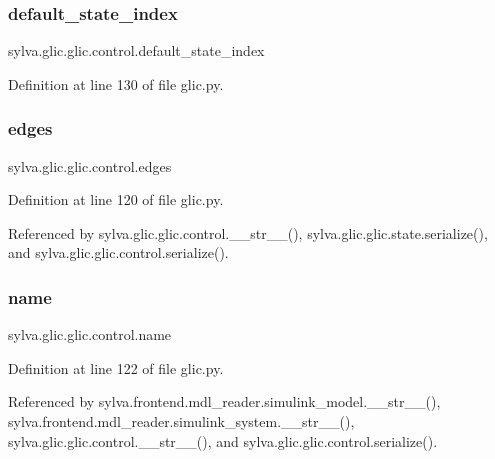 \subsubsection{\texorpdfstring{default\+\_\+state\+\_\+index}{default\_state\_index}}
{\footnotesize\ttfamily sylva.\+glic.\+glic.\+control.\+default\+\_\+state\+\_\+index}



Definition at line 130 of file glic.\+py.

\mbox{\label{classsylva_1_1glic_1_1glic_1_1control_ae0839083f2b17473598890c7b4690e4f}} 
\subsubsection{\texorpdfstring{edges}{edges}}
{\footnotesize\ttfamily sylva.\+glic.\+glic.\+control.\+edges}



Definition at line 120 of file glic.\+py.



Referenced by sylva.\+glic.\+glic.\+control.\+\_\+\+\_\+str\+\_\+\+\_\+(), sylva.\+glic.\+glic.\+state.\+serialize(), and sylva.\+glic.\+glic.\+control.\+serialize().

\mbox{\label{classsylva_1_1glic_1_1glic_1_1control_a95f657f58c1799fe7004653fe77ce106}} 
\subsubsection{\texorpdfstring{name}{name}}
{\footnotesize\ttfamily sylva.\+glic.\+glic.\+control.\+name}



Definition at line 122 of file glic.\+py.



Referenced by sylva.\+frontend.\+mdl\+\_\+reader.\+simulink\+\_\+model.\+\_\+\+\_\+str\+\_\+\+\_\+(), sylva.\+frontend.\+mdl\+\_\+reader.\+simulink\+\_\+system.\+\_\+\+\_\+str\+\_\+\+\_\+(), sylva.\+glic.\+glic.\+control.\+\_\+\+\_\+str\+\_\+\+\_\+(), and sylva.\+glic.\+glic.\+control.\+serialize().

